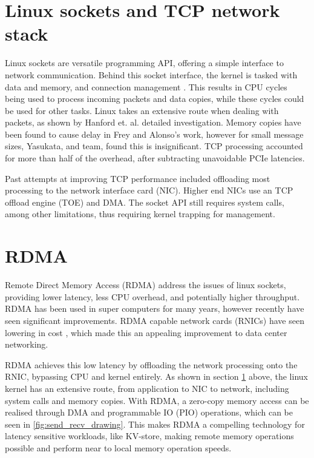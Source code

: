 \section[Linux scokets and TCP]{Linux sockets and TCP network stack}\label{sec:linux-sockets}
Linux sockets are versatile programming API, offering a simple interface to network communication.
Behind this socket interface, the kernel is tasked with data and memory, and connection management\cite{hanford2018survey,seth2009tcp} .
This results in CPU cycles being used to process incoming packets and data copies, while these cycles could be used for other tasks.
Linux takes an extensive route when dealing with packets, as shown by Hanford et. al. detailed investigation\cite{hanford2018survey}.
Memory copies have been found to cause delay in Frey and Alonso's work\cite{frey2009minimizing}, however for small message sizes, Yasukata, and team, found this is insignificant\cite{yasukata2016stackmap}.
TCP processing accounted for more than half of the overhead, after subtracting unavoidable PCIe latencies.

Past attempts at improving TCP performance included offloading most processing to the network interface card (NIC)\cite{hanford2018survey}.
Higher end NICs use an TCP offload engine (TOE) and DMA.
The socket API still requires system calls, among other limitations, thus requiring kernel trapping for management.

\section[RDMA]{RDMA}\label{sec:rdma}
Remote Direct Memory Access (RDMA) address the issues of linux sockets, providing lower latency, less CPU overhead, and potentially higher throughput.
RDMA has been used in super computers for many years, however recently have seen significant improvements.
RDMA capable network cards (RNICs) have seen lowering in cost \cite{kalia2016design}, which made this an appealing improvement to data center networking.

RDMA achieves this low latency by offloading the network processing onto the RNIC, bypassing CPU and kernel entirely.
As shown in section \ref{sec:linux-sockets} above, the linux kernel has an extensive route, from application to NIC to network, including system calls and memory copies.
With RDMA, a zero-copy memory access can be realised through DMA and programmable IO (PIO) operations, which can be seen in \ref{fig:send_recv_drawing}.
This makes RDMA a compelling technology for latency sensitive workloads, like KV-store, making remote memory operations possible and perform near to local memory operation speeds.

